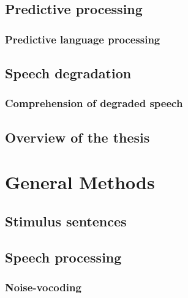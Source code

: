 \documentclass[a4paper, nobind]{templates/ociamthesis}
\begin{document}
\minitoc 

\hypertarget{predictive-processing}{%
\section{Predictive processing}\label{predictive-processing}}

\hypertarget{predictive-language-processing}{%
\subsection{Predictive language processing}\label{predictive-language-processing}}

\hypertarget{speech-degradation}{%
\section{Speech degradation}\label{speech-degradation}}

\hypertarget{comprehension-of-degraded-speech}{%
\subsection{Comprehension of degraded speech}\label{comprehension-of-degraded-speech}}

\hypertarget{overview-of-the-thesis}{%
\section{Overview of the thesis}\label{overview-of-the-thesis}}

\hypertarget{general-methods}{%
\chapter{General Methods}\label{general-methods}}

\minitoc 

\hypertarget{stimulus-sentences}{%
\section{Stimulus sentences}\label{stimulus-sentences}}

\hypertarget{speech-processing}{%
\section{Speech processing}\label{speech-processing}}

\hypertarget{noise-vocoding}{%
\subsection{Noise-vocoding}\label{noise-vocoding}}
\end{document}
